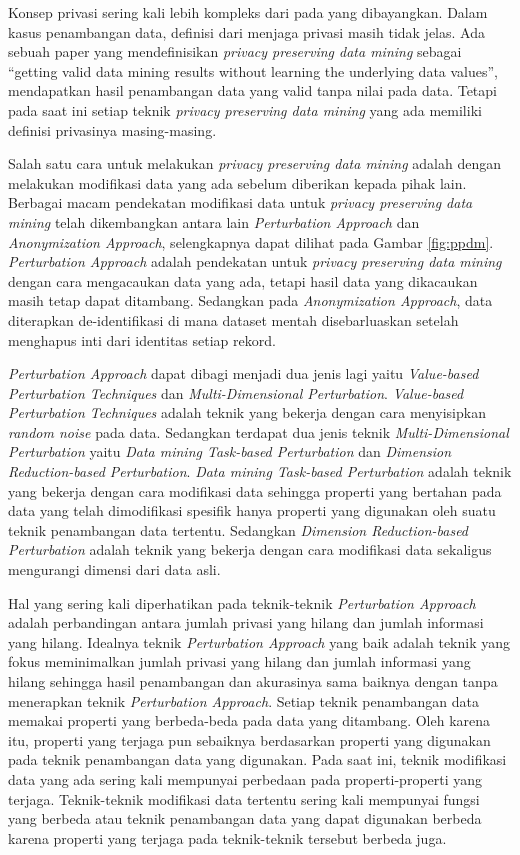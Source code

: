 \documentclass[a4paper,twoside]{article}
\begin{document}
\begin{enumerate}
		Konsep privasi sering kali lebih kompleks dari pada yang dibayangkan. Dalam kasus penambangan data, definisi dari menjaga privasi masih tidak jelas. Ada sebuah paper yang mendefinisikan \textit{privacy preserving data mining} sebagai “getting valid data mining results without learning the underlying data values”, mendapatkan hasil penambangan data yang valid tanpa  nilai pada data. Tetapi pada saat ini setiap teknik \textit{privacy preserving data mining} yang ada memiliki definisi privasinya masing-masing. 
		
		Salah satu cara untuk melakukan \textit{privacy preserving data mining} adalah dengan melakukan modifikasi data yang ada sebelum diberikan kepada pihak lain. Berbagai macam pendekatan modifikasi data untuk \textit{privacy preserving data mining} telah dikembangkan antara lain \textit{Perturbation Approach} dan \textit{Anonymization Approach}, selengkapnya dapat dilihat pada Gambar \ref{fig:ppdm}. \textit{Perturbation Approach} adalah pendekatan untuk \textit{privacy preserving data mining} dengan cara mengacaukan data yang ada, tetapi hasil data yang dikacaukan masih tetap dapat ditambang. Sedangkan pada \textit{Anonymization Approach}, data diterapkan de-identifikasi di mana dataset mentah disebarluaskan setelah menghapus inti dari identitas setiap rekord.
		
		\textit{Perturbation Approach} dapat dibagi menjadi dua jenis lagi yaitu \textit{Value-based Perturbation Techniques} dan \textit{Multi-Dimensional Perturbation}. \textit{Value-based Perturbation Techniques} adalah teknik yang bekerja dengan cara menyisipkan \textit{random noise} pada data. Sedangkan terdapat dua jenis teknik \textit{Multi-Dimensional Perturbation} yaitu \textit{Data mining Task-based Perturbation} dan \textit{Dimension Reduction-based Perturbation}. \textit{Data mining Task-based Perturbation} adalah teknik yang bekerja dengan cara modifikasi data sehingga properti yang bertahan pada data yang telah dimodifikasi spesifik hanya properti yang digunakan oleh suatu teknik penambangan data tertentu. Sedangkan \textit{Dimension Reduction-based Perturbation} adalah teknik yang bekerja dengan cara modifikasi data sekaligus mengurangi dimensi dari data asli.
		
		Hal yang sering kali diperhatikan pada teknik-teknik \textit{Perturbation Approach} adalah perbandingan antara jumlah privasi yang hilang dan jumlah informasi yang hilang. Idealnya teknik \textit{Perturbation Approach} yang baik adalah teknik yang fokus meminimalkan jumlah privasi yang hilang dan jumlah informasi yang hilang sehingga hasil penambangan dan akurasinya sama baiknya dengan tanpa menerapkan teknik \textit{Perturbation Approach}. Setiap teknik penambangan data memakai properti yang berbeda-beda pada data yang ditambang. Oleh karena itu, properti yang terjaga pun sebaiknya berdasarkan properti yang digunakan pada teknik penambangan data yang digunakan. Pada saat ini, teknik modifikasi data yang ada sering kali mempunyai perbedaan pada properti-properti yang terjaga. Teknik-teknik modifikasi data tertentu sering kali mempunyai fungsi yang berbeda atau teknik penambangan data yang dapat digunakan berbeda karena properti yang terjaga pada teknik-teknik tersebut berbeda juga.


\end{enumerate}
\end{document}
